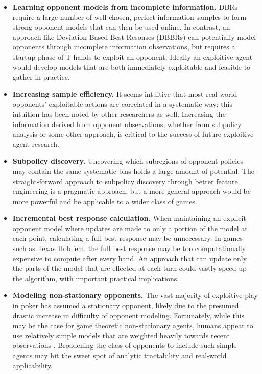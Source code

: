 \documentclass{aamas2013}
\begin{document}
\begin{itemize}
\item \textbf{Learning opponent models from incomplete information.} DBRs \cite{dbr} require a large number of well-chosen, perfect-information samples to form strong opponent models that can then be used online. In contrast, an approach like Deviation-Based Best Resonses (DBBRs) \cite{dbbr} can potentially model opponents through incomplete information observations, but requires a startup phase of T hands to exploit an opponent. Ideally an exploitive agent would develop models that are both immediately exploitable and feasible to gather in practice.

\item \textbf{Increasing sample efficiency.} It seems intuitive that most real-world opponents' exploitable actions are correlated in a systematic way; this intuition has been noted by other researchers \cite{shortterm} as well. Increasing the information derived from opponent observations, whether from subpolicy analysis or some other approach, is critical to the success of future exploitive agent research.

\item \textbf{Subpolicy discovery.} Uncovering which subregions of opponent policies may contain the same systematic bias holds a large amount of potential. The straight-forward approach to subpolicy discovery through better feature engineering is a pragmatic approach, but a more general approach would be more powerful and be applicable to a wider class of games.

\item \textbf{Incremental best response calculation.} When maintaining an explicit opponent model where updates are made to only a portion of the model at each point, calculating a full best response may be unnecessary. In games such as Texas Hold'em, the full best response may be too computationally expensive to compute after every hand. An approach that can update only the parts of the model that are effected at each turn could vastly speed up the algorithm, with important practical implications.

\item \textbf{Modeling non-stationary opponents.} The vast majority of exploitive play in poker has assumed a stationary opponent, likely due to the presumed drastic increase in difficulty of opponent modeling. Fortunately, while this may be the case for game theoretic non-stationary agents, humans appear to use relatively simple models that are weighted heavily towards recent observations \cite{simplemodels}. Broadening the class of opponents to include such simple agents may hit the sweet spot of analytic tractability and real-world applicability.


\end{itemize}
\end{document}
